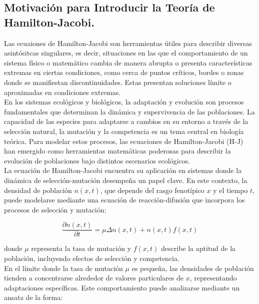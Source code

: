 \documentclass[letterpaper]{article}
\newcommand{\cbk}[1]{ \left( #1 \right) }
\newcommand{\Partial}[2]{ \frac{\partial#1}{\partial#2} }
\begin{document}
{        \subsection{Motivación para Introducir la Teoría de Hamilton-Jacobi.}

            \normalsize{Las ecuaiones de Hamilton-Jacobi son herramientas útiles para describir diversas asintósitcas singulares, es decir, situaciones en las que el comportamiento de un sistema físico o matemático cambia  de manera abrupta o presenta características extremas en ciertas condiciones, como cerca de puntos críticos, bordes o zonas donde se manifiestan discontinuidades. Estas presentan soluciones límite o aproximadas en condiciones extremas.
            }\\

            \normalsize{En los sistemas ecológicos y biológicos, la adaptación y evolución son procesos fundamentales que determinan la dinámica y supervivencia de las poblaciones. La capacidad de las especies para adaptarse a cambios en su entorno a través de la selección natural, la mutación y la competencia es un tema central en biología teórica. Para modelar estos procesos, las ecuaciones de Hamilton-Jacobi (H-J) han emergido como herramientas matemáticas poderosas para describir la evolución de poblaciones bajo distintos escenarios ecológicos.}\\

            \normalsize{La ecuación de Hamilton-Jacobi encuentra su aplicación en sistemas donde la dinámica de selección-mutación desempeña un papel clave. En este contexto, la densidad de población \( n(x, t) \), que depende del rasgo fenotípico \( x \) y el tiempo \( t \), puede modelarse mediante una ecuación de reacción-difusión que incorpora los procesos de selección y mutación:}

            \[
                \Partial{n\cbk{x,t}}{t} = \mu\Delta n\cbk{x,t} + n\cbk{x,t}f\cbk{x,t}
            \]

            \normalsize{donde \( \mu \) representa la tasa de mutación y \( f(x, t) \) describe la aptitud de la población, incluyendo efectos de selección y competencia.}\\

            \normalsize{En el límite donde la tasa de mutación \( \mu \) es pequeña, las densidades de población tienden a concentrarse alrededor de valores particulares de \( x \), representando adaptaciones específicas. Este comportamiento puede analizarse mediante un ansatz de la forma:}

}
\end{document}
